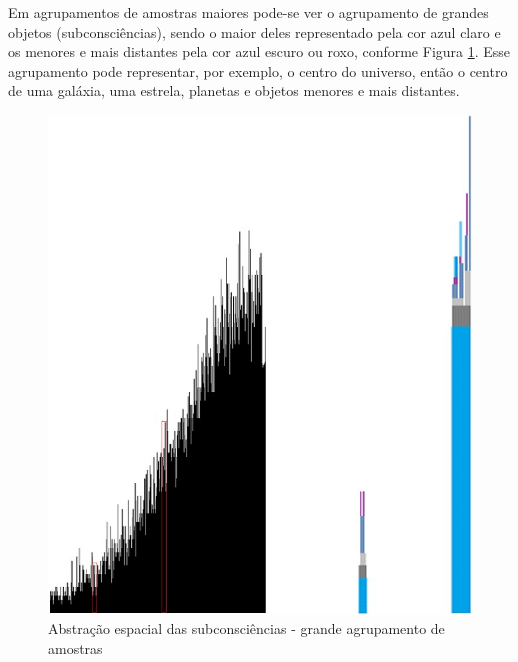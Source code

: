 Em agrupamentos de amostras maiores pode-se ver o agrupamento de grandes objetos (subconsciências), sendo o maior deles representado pela cor azul claro e os menores e mais distantes pela cor azul escuro ou roxo, conforme Figura \ref{fig:consciousness_space_subconsciousness}. Esse agrupamento pode representar, por exemplo, o centro do universo, então o centro de uma galáxia, uma estrela, planetas e objetos menores e mais distantes.
\begin{figure}[H]
\caption{Abstração espacial das subconsciências - grande agrupamento de amostras}
\label{fig:consciousness_space_subconsciousness}
\centering
\includegraphics[scale=.5]{sections/images/consciousness_space_subconsciousness.jpg}
\end{figure}

